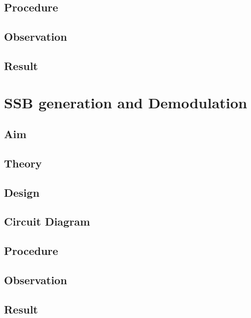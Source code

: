 \documentclass{book}
\begin{document}
\section*{Procedure}
\section*{Observation}
\section*{Result}
\chapter[SSB generation and Demodulation]{SSB generation and Demodulation}
\section*{Aim}
\section*{Theory}
\section*{Design}
\section*{Circuit Diagram}
\section*{Procedure}
\section*{Observation}
\section*{Result}
\begin{thebibliography}{1}

\end{thebibliography}
\end{document}
